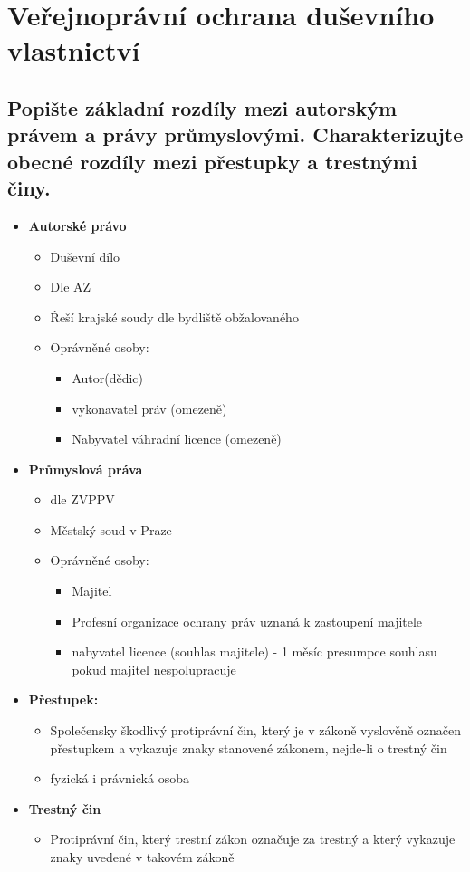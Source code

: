 
\section{Veřejnoprávní ochrana duševního vlastnictví}



\subsection{Popište základní rozdíly mezi autorským právem a právy průmyslovými. Charakterizujte obecné rozdíly mezi přestupky a trestnými činy.}
\begin{itemize}
    \item \textbf{Autorské právo}\begin{itemize}
        \item Duševní dílo
        \item Dle AZ
        \item Řeší krajské soudy dle bydliště obžalovaného
        \item Oprávněné osoby:\begin{itemize}
            \item Autor(dědic)
            \item vykonavatel práv (omezeně)
            \item Nabyvatel váhradní licence (omezeně)
        \end{itemize}
    \end{itemize}
    \item \textbf{Průmyslová práva}\begin{itemize}
        \item dle ZVPPV
        \item Městský soud  v Praze
        \item Oprávněné osoby:\begin{itemize}
            \item Majitel 
            \item Profesní organizace ochrany práv uznaná k zastoupení majitele
            \item nabyvatel licence (souhlas majitele) - 1 měsíc presumpce souhlasu pokud majitel nespolupracuje
        \end{itemize}
    \end{itemize}
    \item \textbf{Přestupek:}\begin{itemize}
        \item Společensky škodlivý protiprávní čin, který je v zákoně vyslověně označen přestupkem a vykazuje znaky stanovené zákonem, nejde-li o trestný čin
        \item fyzická i právnická osoba
    \end{itemize}
    \item \textbf{Trestný čin}\begin{itemize}
        \item Protiprávní čin, který trestní zákon označuje za trestný a který vykazuje znaky uvedené v takovém zákoně
    \end{itemize}
    
\end{itemize}

